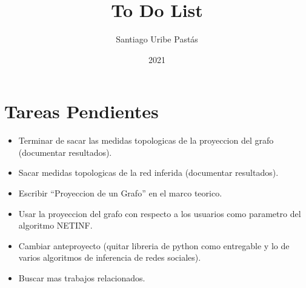\documentclass{article}
\title{To Do List}
\author{Santiago Uribe Pastás}
\date{2021}
\begin{document}
\maketitle

\section{Tareas Pendientes}
\begin{itemize}
    \item Terminar de sacar las medidas topologicas de la proyeccion del grafo (documentar resultados).
    \item Sacar medidas topologicas de la red inferida (documentar resultados).
    \item Escribir ``Proyeccion de un Grafo'' en el marco teorico.
    \item Usar la proyeccion del grafo con respecto a los usuarios como parametro del algoritmo NETINF.
    \item Cambiar anteproyecto (quitar libreria de python como entregable y lo de varios algoritmos de inferencia de redes sociales).
    \item Buscar mas trabajos relacionados.
\end{itemize}
\end{document}
